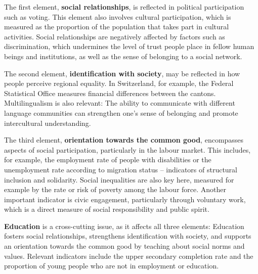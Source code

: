 \documentclass[
  a4paper,
  DIV=11,
  numbers=noendperiod,
  oneside,
  openany]{scrreprt}
\begin{document}
The first element, \textbf{social relationships}, is reflected in
political participation such as voting. This element also involves
cultural participation, which is measured as the proportion of the
population that takes part in cultural activities. Social relationships
are negatively affected by factors such as discrimination, which
undermines the level of trust people place in fellow human beings and
institutions, as well as the sense of belonging to a social network.

The second element, \textbf{identification with society}, may be
reflected in how people perceive regional equality. In Switzerland, for
example, the Federal Statistical Office measures financial differences
between the cantons. Multilingualism is also relevant: The ability to
communicate with different language communities can strengthen one's
sense of belonging and promote intercultural understanding.

The third element, \textbf{orientation towards the common good},
encompasses aspects of social participation, particularly in the labour
market. This includes, for example, the employment rate of people with
disabilities or the unemployment rate according to migration status --
indicators of structural inclusion and solidarity. Social inequalities
are also key here, measured for example by the rate or risk of poverty
among the labour force. Another important indicator is civic engagement,
particularly through voluntary work, which is a direct measure of social
responsibility and public spirit.

\textbf{Education} is a cross-cutting issue, as it affects all three
elements: Education fosters social relationships, strengthens
identification with society, and supports an orientation towards the
common good by teaching about social norms and values. Relevant
indicators include the upper secondary completion rate and the
proportion of young people who are not in employment or education.

\begingroup\fontsize{8}{10}\selectfont
\end{document}

